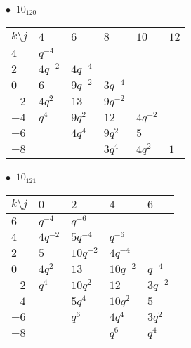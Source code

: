\begin{minipage}{\linewidth}
$\bullet\ $ $10_{120}$ \vspace{0.5em} \\
\begin{tabular}{l|lllll}
$k \setminus j$ & $4$ & $6$ & $8$ & $10$ & $12$ \\
\hline
$4$ & $q^{-4}$ &  &  &  &  \\
$2$ & $4q^{-2}$ & $4q^{-4}$ &  &  &  \\
$0$ & $6$ & $9q^{-2}$ & $3q^{-4}$ &  &  \\
$-2$ & $4q^{2}$ & $13$ & $9q^{-2}$ &  &  \\
$-4$ & $q^{4}$ & $9q^{2}$ & $12$ & $4q^{-2}$ &  \\
$-6$ &  & $4q^{4}$ & $9q^{2}$ & $5$ &  \\
$-8$ &  &  & $3q^{4}$ & $4q^{2}$ & $1$ \\
\end{tabular}
\vspace{2em}
\end{minipage}
%
\begin{minipage}{\linewidth}
$\bullet\ $ $10_{121}$ \vspace{0.5em} \\
\begin{tabular}{l|llll}
$k \setminus j$ & $0$ & $2$ & $4$ & $6$ \\
\hline
$6$ & $q^{-4}$ & $q^{-6}$ &  &  \\
$4$ & $4q^{-2}$ & $5q^{-4}$ & $q^{-6}$ &  \\
$2$ & $5$ & $10q^{-2}$ & $4q^{-4}$ &  \\
$0$ & $4q^{2}$ & $13$ & $10q^{-2}$ & $q^{-4}$ \\
$-2$ & $q^{4}$ & $10q^{2}$ & $12$ & $3q^{-2}$ \\
$-4$ &  & $5q^{4}$ & $10q^{2}$ & $5$ \\
$-6$ &  & $q^{6}$ & $4q^{4}$ & $3q^{2}$ \\
$-8$ &  &  & $q^{6}$ & $q^{4}$ \\
\end{tabular}
\vspace{2em}
\end{minipage}
%
